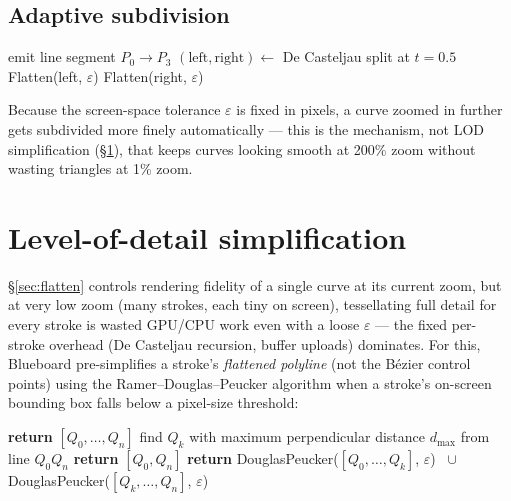 \documentclass[11pt]{article}
\begin{document}
\subsection{Adaptive subdivision}
\begin{algorithm}[h]
\caption{Flatten(curve, $\varepsilon$)}
\begin{algorithmic}[1]
  \State emit line segment $P_0 \to P_3$
\Else
  \State $(\text{left}, \text{right}) \gets$ De Casteljau split at $t=0.5$
  \State Flatten(left, $\varepsilon$)
  \State Flatten(right, $\varepsilon$)
\EndIf
\end{algorithmic}
\end{algorithm}
Because the screen-space tolerance $\varepsilon$ is fixed in pixels, a curve zoomed in
further gets subdivided more finely automatically — this is the mechanism, not LOD
simplification (\S\ref{sec:lod}), that keeps curves looking smooth at 200\% zoom without
wasting triangles at 1\% zoom.

\section{Level-of-detail simplification}
\label{sec:lod}

\S\ref{sec:flatten} controls rendering fidelity of a single curve at its current zoom, but
at very low zoom (many strokes, each tiny on screen), tessellating full detail for every
stroke is wasted GPU/CPU work even with a loose $\varepsilon$ — the fixed per-stroke
overhead (De Casteljau recursion, buffer uploads) dominates. For this, Blueboard
pre-simplifies a stroke's \emph{flattened polyline} (not the Bézier control points) using
the Ramer--Douglas--Peucker algorithm when a stroke's on-screen bounding box falls below a
pixel-size threshold:

\begin{algorithm}[h]
\caption{DouglasPeucker(points $[Q_0,\dots,Q_n]$, $\varepsilon$)}
\begin{algorithmic}[1]
  \State \textbf{return} $[Q_0, \dots, Q_n]$
\EndIf
\State find $Q_k$ with maximum perpendicular distance $d_{\max}$ from line $Q_0 Q_n$
  \State \textbf{return} $[Q_0, Q_n]$
\Else
  \State \textbf{return} DouglasPeucker($[Q_0,\dots,Q_k]$, $\varepsilon$) $\;\cup\;$
         DouglasPeucker($[Q_k,\dots,Q_n]$, $\varepsilon$)
\EndIf
\end{algorithmic}
\end{algorithm}
\end{document}
